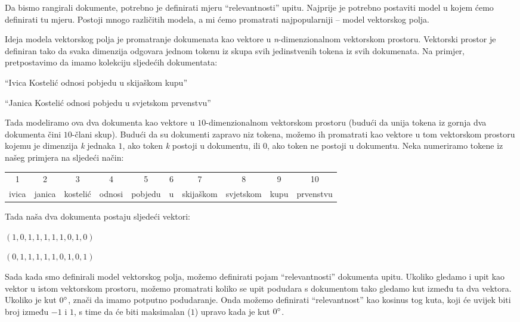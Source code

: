 \documentclass[a4paper,twoside,12pt]{scrreprt}
\begin{document}
Da bismo rangirali dokumente, potrebno je definirati mjeru ``relevantnosti'' upitu. Najprije je potrebno postaviti model u kojem ćemo definirati tu mjeru. Postoji mnogo različitih modela, a mi ćemo promatrati najpopularniji – model vektorskog polja.

Ideja modela vektorskog polja je promatranje dokumenata kao vektore u \textit{n}-dimenzionalnom vektorskom prostoru. Vektorski prostor je definiran tako da svaka dimenzija odgovara jednom tokenu iz skupa svih jedinstvenih tokena iz svih dokumenata. Na primjer, pretpostavimo da imamo kolekciju sljedećih dokumentata:

\begin{compactenum}
  \item ``Ivica Kostelić odnosi pobjedu u skijaškom kupu''
  \item ``Janica Kostelić odnosi pobjedu u svjetskom prvenstvu''
\end{compactenum}

Tada modeliramo ova dva dokumenta kao vektore u $10$-dimenzionalnom vektorskom prostoru (budući da unija tokena iz gornja dva dokumenta čini $10$-člani skup). Budući da su dokumenti zapravo niz tokena, možemo ih promatrati kao vektore u tom vektorskom prostoru kojemu je dimenzija \textit{k} jednaka $1$, ako token \textit{k} postoji u dokumentu, ili $0$, ako token ne postoji u dokumentu. Neka numeriramo tokene iz našeg primjera na sljedeći način:

\begin{center}
  \begin{tabular}{@{\enspace}c@{\enspace}c@{\enspace}c@{\enspace}c@{\enspace}c@{\enspace}c@{\enspace}c@{\enspace}c@{\enspace}c@{\enspace}c@{\enspace}}
    1     & 2      & 3        & 4      & 5       & 6 & 7         & 8         & 9    & 10        \\
    ivica & janica & kostelić & odnosi & pobjedu & u & skijaškom & svjetskom & kupu & prvenstvu \\
  \end{tabular}
\end{center}

Tada naša dva dokumenta postaju sljedeći vektori:

\begin{compactenum}
  \item $(1,0,1,1,1,1,1,0,1,0)$
  \item $(0,1,1,1,1,1,0,1,0,1)$
\end{compactenum}

Sada kada smo definirali model vektorskog polja, možemo definirati pojam ``relevantnosti'' dokumenta upitu. Ukoliko gledamo i upit kao vektor u istom vektorskom prostoru, možemo promatrati koliko se upit podudara s dokumentom tako gledamo kut između ta dva vektora. Ukoliko je kut $0\degree$, znači da imamo potputno podudaranje. Onda možemo definirati ``relevantnost'' kao kosinus tog kuta, koji će uvijek biti broj između $-1$ i $1$, s time da će biti maksimalan ($1$) upravo kada je kut $0\degree$.
\end{document}
